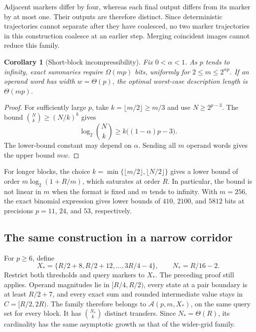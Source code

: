 \documentclass[11pt,reqno]{amsart}
\newtheorem{corollary}[theorem]{Corollary}
\theoremstyle{definition}
\theoremstyle{remark}
\numberwithin{equation}{section}
\begin{document}
Adjacent markers differ by four, whereas each final output differs from
its marker by at most one. Their outputs are therefore distinct. Since
deterministic trajectories cannot separate after they have coalesced,
no two marker trajectories in this construction coalesce at an earlier
step. Merging coincident images cannot reduce this family.

\begin{corollary}[Short-block incompressibility]
\label{cor:short}
Fix $0<\alpha<1$. As $p$ tends to infinity, exact summaries require
$\Omega(mp)$ bits, uniformly for $2\leq m\leq 2^{\alpha p}$.
If an operand word has width $w=\Theta(p)$, the optimal worst-case
description length is $\Theta(mp)$.
\end{corollary}

\begin{proof}
For sufficiently large $p$, take $k=\lfloor m/2\rfloor\geq m/3$ and
use $N\geq 2^{p-3}$. The bound $\binom Nk\geq(N/k)^k$ gives
\[
 \log_2\binom Nk\geq k\bigl((1-\alpha)p-3\bigr).
\]
The lower-bound constant may depend on $\alpha$. Sending all $m$
operand words gives the upper bound $mw$.
\end{proof}

For longer blocks, the choice
$k=\min\{\lfloor m/2\rfloor,\lfloor N/2\rfloor\}$ gives a lower
bound of order $m\log_2(1+R/m)$, which saturates at order $R$.
In particular, the bound is not linear in $m$ when the format is fixed
and $m$ tends to infinity. With $m=256$, the exact binomial expression
gives lower bounds of $410$, $2100$, and $5812$ bits at precisions
$p=11$, $24$, and $53$, respectively.

\subsection{The same construction in a narrow corridor}
\label{subsec:threshold-corridor}

For $p\geq 6$, define
\begin{equation}
\label{eq:corridor-grid}
 X_\ast=\{R/2+8,R/2+12,\ldots,3R/4-4\},
 \qquad N_\ast=R/16-2.
\end{equation}
Restrict both thresholds and query markers to $X_\ast$. The preceding
proof still applies. Operand magnitudes lie in $[R/4,R/2)$, every state
at a pair boundary is at least $R/2+7$, and every exact sum and rounded
intermediate value stays in $C=[R/2,2R)$. The family therefore belongs
to $\mathcal{A}(p,m,X_\ast)$, on the same query set for every block.
It has $\binom{N_\ast}{k}$ distinct transfers. Since $N_\ast=\Theta(R)$,
its cardinality has the same asymptotic growth as that of the wider-grid
family.
\end{document}
